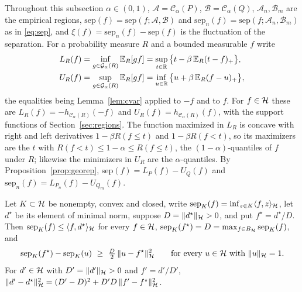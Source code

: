 Throughout this subsection $\alpha\in(0,1)$, $\mathcal A=\mathcal C_\alpha(P)$, $\mathcal B=\mathcal C_\alpha(Q)$,
$\mathcal A_n,\mathcal B_m$ are the empirical regions, $\mathrm{sep}(f)=\mathrm{sep}(f;\mathcal A,\mathcal B)$ and
$\mathrm{sep}_n(f)=\mathrm{sep}(f;\mathcal A_n,\mathcal B_m)$ as in \eqref{eq:sep}, and $\xi(f)=\mathrm{sep}_n(f)-
\mathrm{sep}(f)$ is the fluctuation of the separation. For a probability measure $R$ and a bounded measurable $f$ write
\begin{equation}
\begin{aligned}
L_R(f)&=\inf_{g\in\mathcal G_\alpha(R)}\mathbb{E}_R[gf]=\sup_{t\in\mathbb{R}}\big\{t-\beta\,\mathbb{E}_R(t-f)_+\big\},\\
U_R(f)&=\sup_{g\in\mathcal G_\alpha(R)}\mathbb{E}_R[gf]=\inf_{u\in\mathbb{R}}\big\{u+\beta\,\mathbb{E}_R(f-u)_+\big\},
\end{aligned}
\label{eq:twotail}
\end{equation}
the equalities being Lemma~\ref{lem:cvar} applied to $-f$ and to $f$. For $f\in\mathcal{H}$ these are
$L_R(f)=-h_{\mathcal C_\alpha(R)}(-f)$ and $U_R(f)=h_{\mathcal C_\alpha(R)}(f)$, with the support functions of
Section~\ref{sec:regions}. The function maximized in $L_R$ is concave with
right and left derivatives $1-\beta R(f\le t)$ and $1-\beta R(f<t)$, so its maximizers are the $t$ with
$R(f<t)\le1-\alpha\le R(f\le t)$, the $(1-\alpha)$-quantiles of $f$ under $R$; likewise the minimizers in $U_R$ are the
$\alpha$-quantiles. By Proposition~\ref{prop:georep}, $\mathrm{sep}(f)=L_P(f)-U_Q(f)$ and
$\mathrm{sep}_n(f)=L_{P_n}(f)-U_{Q_m}(f)$.

\begin{lemma}
\label{lem:sepmargin}
Let $K\subset\mathcal{H}$ be nonempty, convex and closed, write $\mathrm{sep}_K(f)=\inf_{z\in K}\langle f,z\rangle_{\mathcal{H}}$, let
$d^\star$ be its element of minimal norm, suppose $D=\|d^\star\|_{\mathcal{H}}>0$, and put $f^\star=d^\star/D$. Then
$\mathrm{sep}_K(f)\le\langle f,d^\star\rangle_{\mathcal{H}}$ for every $f\in\mathcal{H}$, $\mathrm{sep}_K(f^\star)=D=\max_{f\in B_{\mathcal{H}}}
\mathrm{sep}_K(f)$, and
\[
\mathrm{sep}_K(f^\star)-\mathrm{sep}_K(u)\ \ge\ \tfrac D2\,\|u-f^\star\|_\Hh^2
\qquad\text{for every }u\in\Hh\text{ with }\|u\|_\Hh=1 .
\]
For $d'\in\mathcal{H}$ with $D'=\|d'\|_{\mathcal{H}}>0$ and $f'=d'/D'$,
$\|d'-d^\star\|_{\mathcal{H}}^2=(D'-D)^2+D'D\,\|f'-f^\star\|_{\mathcal{H}}^2$.
\end{lemma}

